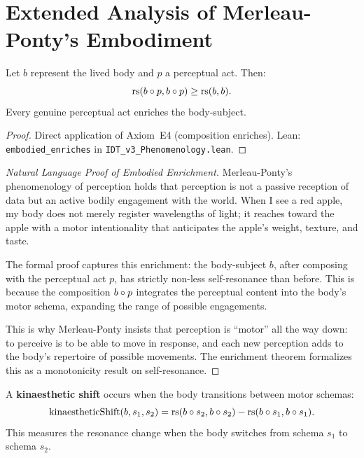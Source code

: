 \section{Extended Analysis of Merleau-Ponty's Embodiment}

\begin{theorem}
\label{thm:embodied-enriches}
Let $b$ represent the lived body and $p$ a perceptual act.  Then:
\[
\mathrm{rs}(b \circ p, b \circ p) \geq \mathrm{rs}(b, b).
\]
Every genuine perceptual act enriches the body-subject.
\end{theorem}

\begin{proof}
Direct application of Axiom~E4 (composition enriches).
Lean: \texttt{embodied\_enriches} in \texttt{IDT\_v3\_Phenomenology.lean}.
\end{proof}

\begin{proof}[Natural Language Proof of Embodied Enrichment]
Merleau-Ponty's phenomenology of perception holds that perception is not a
passive reception of data but an active bodily engagement with the world.
When I see a red apple, my body does not merely register wavelengths of light;
it reaches toward the apple with a motor intentionality that anticipates the
apple's weight, texture, and taste.

The formal proof captures this enrichment: the body-subject $b$, after
composing with the perceptual act $p$, has strictly non-less self-resonance
than before.  This is because the composition $b \circ p$ integrates the
perceptual content into the body's motor schema, expanding the range of
possible engagements.

This is why Merleau-Ponty insists that perception is ``motor'' all the way
down: to perceive is to be able to move in response, and each new perception
adds to the body's repertoire of possible movements.  The enrichment theorem
formalizes this as a monotonicity result on self-resonance.
\end{proof}

\begin{definition}
\label{def:kinaesthetic-shift}
A \textbf{kinaesthetic shift} occurs when the body transitions between motor
schemas:
\[
\mathrm{kinaestheticShift}(b, s_1, s_2) = \mathrm{rs}(b \circ s_2, b \circ s_2) - \mathrm{rs}(b \circ s_1, b \circ s_1).
\]
This measures the resonance change when the body switches from schema $s_1$ to
schema $s_2$.
\end{definition}

